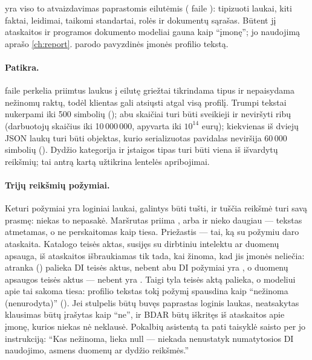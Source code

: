  yra viso to atvaizdavimas paprastomis eilutėmis
( faile ): tipizuoti laukai, kiti faktai,
leidimai, taikomi standartai, rolės ir dokumentų sąrašas. Būtent jį ataskaitos ir programos
dokumento modeliai gauna kaip \enquote{įmonę}; jo naudojimą aprašo \cref{ch:report}.
 parodo pavyzdinės įmonės profilio tekstą.

\paragraph{Patikra.}  faile  perkelia
priimtus laukus į eilutę griežtai tikrindama tipus ir nepaisydama nežinomų raktų, todėl
klientas gali atsiųsti atgal visą profilį. Trumpi tekstai nukerpami iki 500 simbolių
(); abu skaičiai turi būti sveikieji ir neviršyti  ribų
(darbuotojų skaičius iki 10\,000\,000, apyvarta iki $10^{14}$ eurų); kiekvienas iš dviejų JSON laukų
turi būti objektas, kurio serializuotas pavidalas neviršija 60\,000 simbolių
(). Dydžio kategorija ir įstaigos tipas turi būti viena iš išvardytų
reikšmių; tai antrą kartą užtikrina lentelės  apribojimai.

\paragraph{Trijų reikšmių požymiai.} Keturi požymiai yra loginiai laukai, galintys būti tušti,
ir tuščia reikšmė turi savą prasmę: niekas to nepasakė. Maršrutas priima ,
 arba  ir nieko daugiau --- tekstas  atmetamas, o ne
perskaitomas kaip tiesa. Priežastis --- tai, ką su požymiu daro ataskaita. Katalogo teisės
aktas, susijęs su dirbtiniu intelektu ar duomenų apsauga, iš ataskaitos išbraukiamas tik tada,
kai žinoma, kad jis įmonės neliečia: atranka () palieka DI teisės aktus,
nebent abu DI požymiai yra , o duomenų apsaugos teisės aktus --- nebent
 yra . Taigi tyla teisės aktą palieka, o modeliui apie
tai sakoma tiesa: profilio tekstas tokį požymį spausdina kaip \enquote{nežinoma (nenurodyta)}
(). Jei stulpelis būtų buvęs paprastas loginis laukas, neatsakytas klausimas būtų
įrašytas kaip \enquote{ne}, ir BDAR būtų iškritęs iš ataskaitos apie įmonę, kurios niekas nė
neklausė. Pokalbių asistentą ta pati taisyklė saisto per jo instrukciją: \enquote{Kas nežinoma,
lieka null --- niekada nenustatyk numatytosios DI naudojimo, asmens duomenų ar dydžio
reikšmės.}

